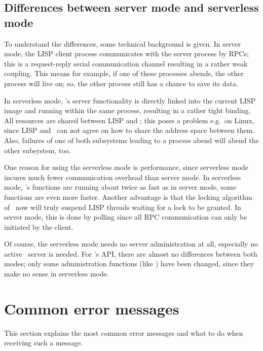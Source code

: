 \subsection[Server and serverless mode]
{Differences between server mode and serverless mode}

To understand the differences, some technical background is given. In
server mode, the LISP client process communicates with the server
process by RPCs; this is a request-reply serial communication channel
resulting in a rather weak coupling. This means for example, if one of
these processes abends, the other process will live on; so, the other
process still has a chance to save its data.

In serverless mode, \plobwoexcl's server functionality is directly
linked into the current LISP image and running within the same
process, resulting in a rather tight binding. All resources are shared
between LISP and \plobwoexcl; this poses a problem e.g.\ on Linux,
since LISP and \plob\ can not agree on how to share the address space
between them. Also, failures of one of both subsystems leading to a
process abend will abend the other subsystem, too.

One reason for using the serverless mode is performance, since
serverless mode incures much fewer communication overhead than server
mode.  In serverless mode, \plobwoexcl's functions are running about
twice as fast as in server mode, some functions are even more
faster. Another advantage is that the locking algorithm of \plob\ now
will truly suspend LISP threads waiting for a lock to be granted. In
server mode, this is done by polling since all RPC communication can
only be initiated by the client.

Of course, the serverless mode needs no server administration at all,
especially no active \plob\ server is needed.  For \plobwoexcl's API,
there are almost no differences between both modes; only some
administration functions (like ) have been changed,
since they make no sense in serverless mode.

{\section{Common error messages}}%
\label{sec:CommonErrorMessages}

This section explains the most common error messages and what to do
when receiving such a message.

